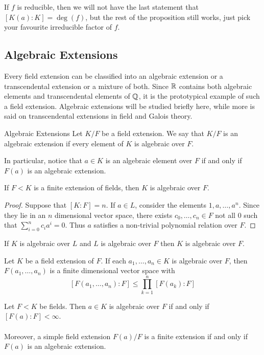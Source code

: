 \documentclass[a4paper]{article}
\begin{document}
If $f$ is reducible, then we will not have the last statement that $[K(a):K]=\deg(f)$, but the rest of the proposition still works, just pick your favourite irreducible factor of $f$. 

\subsection{Algebraic Extensions}
Every field extension can be classified into an algebraic extension or a transcendental extension or a mixture of both. Since $\mathbb{R}$ contains both algebraic elements and transcendental elements of $\mathbb{Q}$, it is the prototypical example of such a field extension. Algebraic extensions will be studied briefly here, while more is said on transcendental extensions in field and Galois theory. 

\begin{defn}{Algebraic Extensions}{} Let $K/F$ be a field extension. We say that $K/F$ is an algebraic extension if every element of $K$ is algebraic over $F$. 
\end{defn}

In particular, notice that $a\in K$ is an algebraic element over $F$ if and only if $F(a)$ is an algebraic extension. 

\begin{lmm}{}{} If $F<K$ is a finite extension of fields, then $K$ is algebraic over $F$. \tcbline
\begin{proof}
Suppose that $[K:F]=n$. If $a\in L$, consider the elements $1,a,\dots,a^n$. Since they lie in an $n$ dimensional vector space, there exists $c_0,\dots,c_n\in F$ not all $0$ such that $\sum_{i=0}^nc_ia^i=0$. Thus $a$ satisfies a non-trivial polynomial relation over $F$. 
\end{proof}
\end{lmm}

\begin{thm}{}{} If $K$ is algebraic over $L$ and $L$ is algebraic over $F$ then $K$ is algebraic over $F$. 
\end{thm}

\begin{prp}{}{} Let $K$ be a field extension of $F$. If each $a_1,\dots,a_n\in K$ is algebraic over $F$, then $F(a_1,\dots,a_n)$ is a finite dimensional vector space with $$[F(a_1,\dots,a_n):F]\leq\prod_{k=1}^n[F(a_k):F]$$
\end{prp}

\begin{crl}{}{} Let $F<K$ be fields. Then $a\in K$ is algebraic over $F$ if and only if $[F(a):F]<\infty$. \\~\\

Moreover, a simple field extension $F(a)/F$ is a finite extension if and only if $F(a)$ is an algebraic extension. 
\end{crl}
\end{document}
